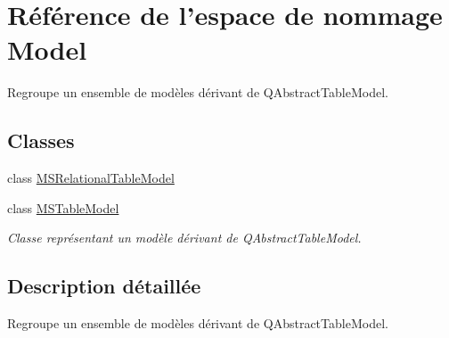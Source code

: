 \hypertarget{namespace_model}{
\section{Référence de l'espace de nommage Model}
\label{d7/dcb/namespace_model}
}


Regroupe un ensemble de modèles dérivant de QAbstractTableModel.  


\subsection*{Classes}
\begin{DoxyCompactItemize}
\item 
class \hyperlink{class_model_1_1_m_s_relational_table_model}{MSRelationalTableModel}
\item 
class \hyperlink{class_model_1_1_m_s_table_model}{MSTableModel}
\begin{DoxyCompactList}\small\item\em Classe représentant un modèle dérivant de QAbstractTableModel. \item\end{DoxyCompactList}\end{DoxyCompactItemize}


\subsection{Description détaillée}
Regroupe un ensemble de modèles dérivant de QAbstractTableModel. 